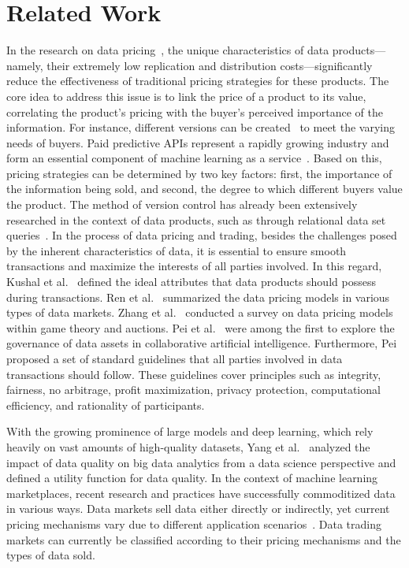 \section{Related Work}
\label{sec:related}
In the research on data pricing~\cite{ref1}, the unique characteristics of data products—namely, their extremely low replication and distribution costs—significantly reduce the effectiveness of traditional pricing strategies for these products. The core idea to address this issue is to link the price of a product to its value, correlating the product's pricing with the buyer's perceived importance of the information. For instance, different versions can be created~\cite{ref11} to meet the varying needs of buyers. Paid predictive APIs represent a rapidly growing industry and form an essential component of machine learning as a service~\cite{ref50}. Based on this, pricing strategies can be determined by two key factors: first, the importance of the information being sold, and second, the degree to which different buyers value the product. The method of version control has already been extensively researched in the context of data products, such as through relational data set queries~\cite{ref12}. In the process of data pricing and trading, besides the challenges posed by the inherent characteristics of data, it is essential to ensure smooth transactions and maximize the interests of all parties involved. In this regard, Kushal et al.~\cite{ref10} defined the ideal attributes that data products should possess during transactions. Ren et al.~\cite{ref59} summarized the data pricing models in various types of data markets. Zhang et al.~\cite{ref64} conducted a survey on data pricing models within game theory and auctions. Pei et al.~\cite{ref61} were among the first to explore the governance of data assets in collaborative artificial intelligence. Furthermore, Pei~\cite{ref20} proposed a set of standard guidelines that all parties involved in data transactions should follow. These guidelines cover principles such as integrity, fairness, no arbitrage, profit maximization, privacy protection, computational efficiency, and rationality of participants.

With the growing prominence of large models and deep learning, which rely heavily on vast amounts of high-quality datasets, Yang et al.~\cite{ref62} analyzed the impact of data quality on big data analytics from a data science perspective and defined a utility function for data quality. In the context of machine learning marketplaces, recent research and practices have successfully commoditized data in various ways. Data markets sell data either directly or indirectly, yet current pricing mechanisms vary due to different application scenarios~\cite{ref68, ref72, ref70}. Data trading markets can currently be classified according to their pricing mechanisms and the types of data sold.

